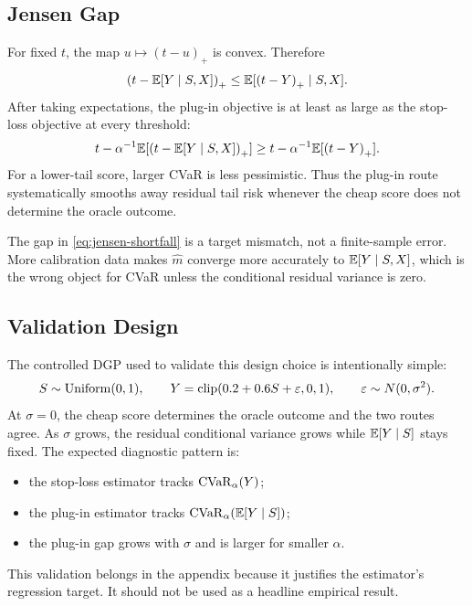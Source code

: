 \subsection{Jensen Gap}

For fixed $t$, the map $u\mapsto(t-u)_+$ is convex. Therefore
\begin{equation}
\left(t-\mathbb{E}[Y\mid S,X]\right)_{+}
\le
\mathbb{E}[\left(t-Y\right)_{+}\mid S,X].
\label{eq:jensen-shortfall}
\end{equation}
After taking expectations, the plug-in objective is at least as large as the
stop-loss objective at every threshold:
\[
t-\alpha^{-1}\mathbb{E}[\left(t-\mathbb{E}[Y\mid S,X]\right)_{+}]
\ge
t-\alpha^{-1}\mathbb{E}[\left(t-Y\right)_{+}].
\]
For a lower-tail score, larger CVaR is less pessimistic. Thus the plug-in
route systematically smooths away residual tail risk whenever the cheap score
does not determine the oracle outcome.

\begin{remark}
The gap in \cref{eq:jensen-shortfall} is a target mismatch, not a finite-sample
error. More calibration data makes $\hat m$ converge more accurately to
$\mathbb{E}[Y\mid S,X]$, which is the wrong object for CVaR unless the
conditional residual variance is zero.
\end{remark}

\subsection{Validation Design}

The controlled DGP used to validate this design choice is intentionally simple:
\[
S\sim\mathrm{Uniform}(0,1),\qquad
Y=\mathrm{clip}(0.2+0.6S+\varepsilon,0,1),
\qquad
\varepsilon\sim N(0,\sigma^2).
\]
At $\sigma=0$, the cheap score determines the oracle outcome and the two
routes agree. As $\sigma$ grows, the residual conditional variance grows while
$\mathbb{E}[Y\mid S]$ stays fixed. The expected diagnostic pattern is:
\begin{itemize}[leftmargin=*,nosep]
\item the stop-loss estimator tracks $\mathrm{CVaR}_\alpha(Y)$;
\item the plug-in estimator tracks $\mathrm{CVaR}_\alpha(\mathbb{E}[Y\mid S])$;
\item the plug-in gap grows with $\sigma$ and is larger for smaller $\alpha$.
\end{itemize}
This validation belongs in the appendix because it justifies the estimator's
regression target. It should not be used as a headline empirical result.
